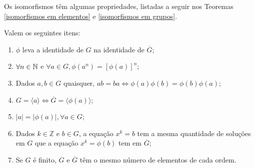 	Os isomorfismos têm algumas propriedades, 
	listadas a seguir nos Teoremas \ref{isomorfismos em elementos} 
	e \ref{isomorfismos em grupos}.
	\begin{theorem}
	\label{isomorfismos em elementos}
	    Valem os seguintes itens:
		\begin{enumerate}
			\item \vspace{0.3cm} $\phi$ leva a identidade de $G$ na
			identidade de $\overline{G}$;
			\item $\forall n\in\mathbb{N}$ e $\forall a\in G, \phi (a^n) = [\phi (a)]^n$;
			\item Dados $a,b \in G$ quaisquer, 
			$ab = ba \iff \phi (a)\phi (b) = \phi (b)\phi (a)$;
			\item $G = \langle a \rangle \iff \overline{G} =
			\langle\phi(a) \rangle$;
			\item $|a| = |\phi(a)|, \forall a\in G$;
			\item Dados $k\in\mathbb{Z}$ e $b\in G$, a equação 
			$x^k = b$ tem a mesma quantidade de soluções em $G$ que a
			equação $x^k = \phi(b)$ tem em $\overline{G}$;
			\item Se $G$ é finito, $G$ e $\overline{G}$ têm o mesmo
			número de elementos de cada ordem. 
		\end{enumerate}
	\end{theorem}
